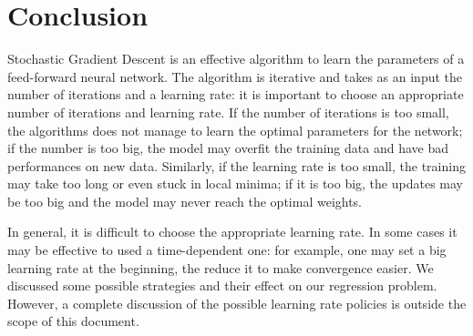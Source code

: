 \section{Conclusion}
\label{sec:conclusion}

Stochastic Gradient Descent is an effective algorithm to learn the parameters of a feed-forward neural network.
The algorithm is iterative and takes as an input the number of iterations and a learning rate:
it is important to choose an appropriate number of iterations and learning rate.
If the number of iterations is too small, the algorithms does not manage to learn the optimal parameters for the network;
if the number is too big, the model may overfit the training data and have bad performances on new data.
Similarly, if the learning rate is too small, the training may take too long or even stuck in local minima;
if it is too big, the updates may be too big and the model may never reach the optimal weights.

In general, it is difficult to choose the appropriate learning rate.
In some cases it may be effective to used a time-dependent one:
for example, one may set a big learning rate at the beginning, the reduce it to make convergence easier.
We discussed some possible strategies and their effect on our regression problem.
However, a complete discussion of the possible learning rate policies is outside the scope of this document.

